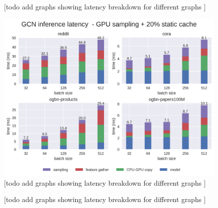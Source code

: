 \begin{figure}[h!]
    \centering
    
    \caption{[todo add graphs showing latency breakdown for different graphs ]}
    \label{Baseline Latency Breakdown}
\end{figure}    

\begin{figure}[h!]
    \centering
    \includegraphics[width=\textwidth]{figures/GCN_latency_breakdown_gpu_sampled_with_cache.png}
    
    \caption{[todo add graphs showing latency breakdown for different graphs ]}
    \label{GPU Sampling Latency Breakdown}
\end{figure}    


\begin{figure}[h!]
    \centering
    
    \caption{[todo add graphs showing latency breakdown for different graphs ]}
    \label{Static Cache Latency Breakdown}
\end{figure}    
